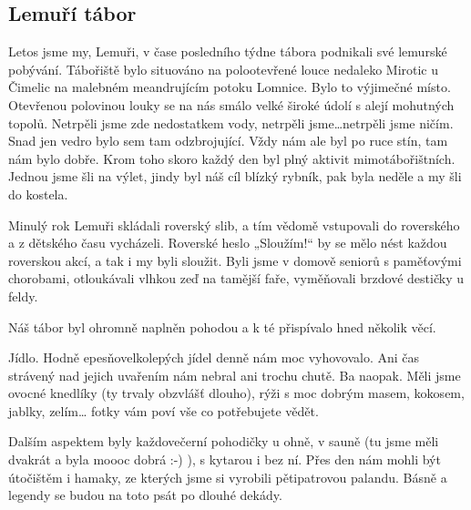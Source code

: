 \subsection*{Lemuří tábor}
\label{sub:lemurui_tabor}

Letos jsme my, Lemuři, v čase posledního týdne tábora podnikali své lemurské pobývání. Tábořiště bylo situováno na polootevřené louce nedaleko Mirotic u Čimelic na malebném meandrujícím potoku Lomnice. Bylo to výjimečné místo. Otevřenou polovinou louky se na nás smálo velké široké údolí s alejí mohutných topolů. Netrpěli jsme zde nedostatkem vody, netrpěli jsme…netrpěli jsme ničím. Snad jen vedro bylo sem tam odzbrojující. Vždy nám ale byl po ruce stín, tam nám bylo dobře. Krom toho skoro každý den byl plný aktivit mimotábořištních. Jednou jsme šli na výlet, jindy byl náš cíl blízký rybník, pak byla neděle a my šli do kostela.

Minulý rok Lemuři skládali roverský slib, a tím vědomě vstupovali do roverského a z dětského času vycházeli. Roverské heslo „Sloužím!“ by se mělo nést každou roverskou akcí, a tak i my byli sloužit. Byli jsme v domově seniorů s paměťovými chorobami, otloukávali vlhkou zeď na tamější faře, vyměňovali brzdové destičky u feldy.  

Náš tábor byl ohromně naplněn pohodou a k té přispívalo hned několik věcí.

Jídlo. Hodně epesňovelkolepých jídel denně nám moc vyhovovalo. Ani čas strávený nad jejich uvařením nám nebral ani trochu chutě. Ba naopak. Měli jsme ovocné knedlíky (ty trvaly obzvlášť dlouho), rýži s moc dobrým masem, kokosem, jablky, zelím… fotky vám poví vše co potřebujete vědět.   

Dalším aspektem byly každovečerní pohodičky u ohně, v sauně (tu jsme měli dvakrát a byla moooc dobrá :-) ), s kytarou i bez ní. Přes den nám mohli být útočištěm i hamaky, ze kterých jsme si vyrobili pětipatrovou palandu.  Básně a legendy se budou na toto psát po dlouhé dekády. 

